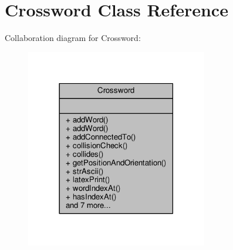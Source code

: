 \hypertarget{classCrossword}{}\section{Crossword Class Reference}
\label{classCrossword}


Collaboration diagram for Crossword\+:
\nopagebreak
\begin{figure}[H]
\begin{center}
\leavevmode
\includegraphics[width=225pt]{classCrossword__coll__graph}
\end{center}
\end{figure}
